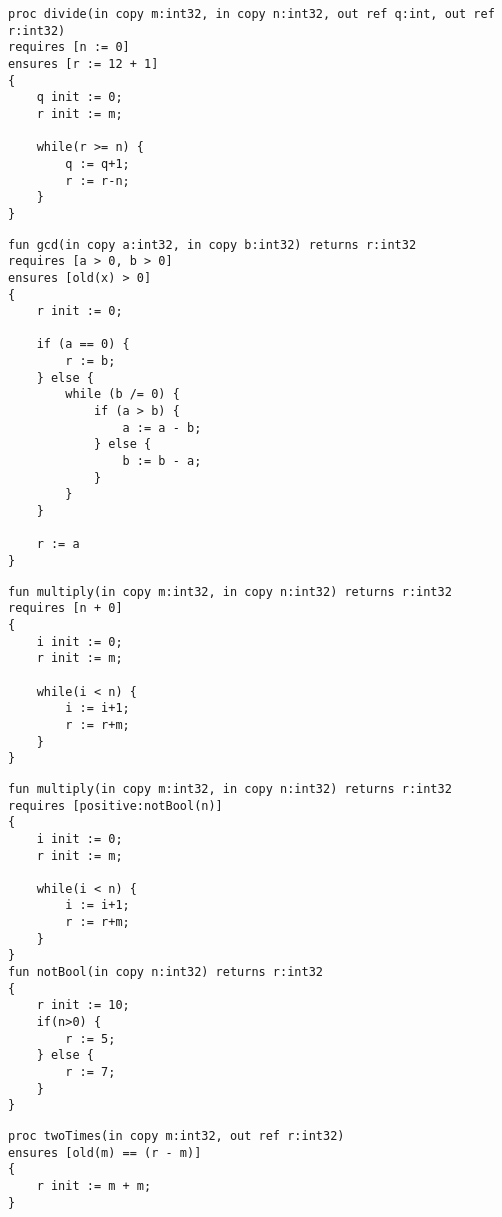 \begin{lstlisting}[caption=Wert einer Variable in der pre-/postcondition ändern]
proc divide(in copy m:int32, in copy n:int32, out ref q:int, out ref r:int32)
requires [n := 0]
ensures [r := 12 + 1]
{
    q init := 0;
    r init := m;

    while(r >= n) {
        q := q+1;
        r := r-n;
    }
}
\end{lstlisting}

\begin{lstlisting}[caption=Zugriff auf nicht vorhandene Variable in der old Funktion]
fun gcd(in copy a:int32, in copy b:int32) returns r:int32
requires [a > 0, b > 0]
ensures [old(x) > 0]
{
    r init := 0;
    
    if (a == 0) {
        r := b;
    } else {
        while (b /= 0) {
            if (a > b) {
                a := a - b;
            } else {
                b := b - a;
            }
        }
    }

    r := a
}
\end{lstlisting}

\begin{lstlisting}[caption=Eine nicht Boolsche Expression in der Condition List]
fun multiply(in copy m:int32, in copy n:int32) returns r:int32
requires [n + 0]
{
    i init := 0;
    r init := m;

    while(i < n) {
        i := i+1;
        r := r+m;
    }
}
\end{lstlisting}

\begin{lstlisting}[caption=Eine Funktion in der Condition List welche keinen Boolschen Wert zurückliefert]
fun multiply(in copy m:int32, in copy n:int32) returns r:int32
requires [positive:notBool(n)]
{
    i init := 0;
    r init := m;

    while(i < n) {
        i := i+1;
        r := r+m;
    }
}
fun notBool(in copy n:int32) returns r:int32
{
    r init := 10;
    if(n>0) {
        r := 5;
    } else {
        r := 7;
    }
}
\end{lstlisting}

\begin{lstlisting}[caption=Test]
proc twoTimes(in copy m:int32, out ref r:int32)
ensures [old(m) == (r - m)]
{
    r init := m + m;
}
\end{lstlisting}
